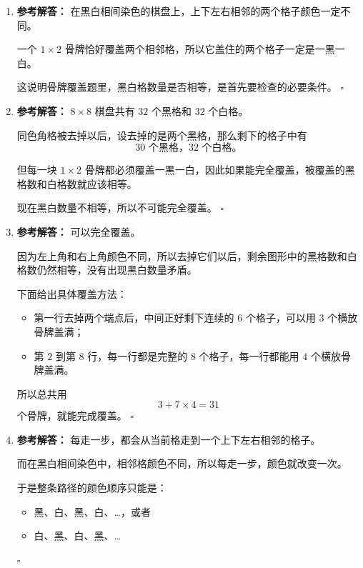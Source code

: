 \documentclass[11pt,a4paper,fontset=fandol]{ctexart}
\newenvironment{solution}{\par\noindent\textbf{参考解答：}}{\hfill$\square$\par}
\begin{document}
\begin{enumerate}
  \item \begin{solution}
  在黑白相间染色的棋盘上，上下左右相邻的两个格子颜色一定不同。

  一个 $1\times 2$ 骨牌恰好覆盖两个相邻格，所以它盖住的两个格子一定是一黑一白。

  这说明骨牌覆盖题里，黑白格数量是否相等，是首先要检查的必要条件。
  \end{solution}

  \item \begin{solution}
  $8\times 8$ 棋盘共有 $32$ 个黑格和 $32$ 个白格。

  同色角格被去掉以后，设去掉的是两个黑格，那么剩下的格子中有
  \[
  30\text{ 个黑格，}32\text{ 个白格}。
  \]

  但每一块 $1\times 2$ 骨牌都必须覆盖一黑一白，因此如果能完全覆盖，被覆盖的黑格数和白格数就应该相等。

  现在黑白数量不相等，所以不可能完全覆盖。
  \end{solution}

  \item \begin{solution}
  可以完全覆盖。

  因为左上角和右上角颜色不同，所以去掉它们以后，剩余图形中的黑格数和白格数仍然相等，没有出现黑白数量矛盾。

  下面给出具体覆盖方法：
  \begin{itemize}
    \item 第一行去掉两个端点后，中间正好剩下连续的 $6$ 个格子，可以用 $3$ 个横放骨牌盖满；
    \item 第 $2$ 到第 $8$ 行，每一行都是完整的 $8$ 个格子，每一行都能用 $4$ 个横放骨牌盖满。
  \end{itemize}

  所以总共用
  \[
  3+7\times 4=31
  \]
  个骨牌，就能完成覆盖。
  \end{solution}

  \item \begin{solution}
  每走一步，都会从当前格走到一个上下左右相邻的格子。

  而在黑白相间染色中，相邻格颜色不同，所以每走一步，颜色就改变一次。

  于是整条路径的颜色顺序只能是：
  \begin{itemize}
    \item 黑、白、黑、白、\ldots，或者
    \item 白、黑、白、黑、\ldots
  \end{itemize}


\end{solution}
\end{enumerate}
\end{document}
